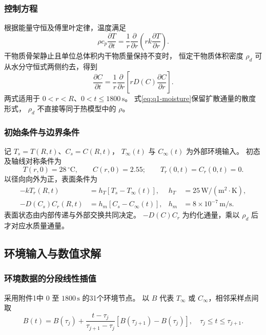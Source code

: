 \subsubsection{控制方程}
根据能量守恒及傅里叶定律，温度满足
\begin{equation}
\rho c_p\frac{\partial T}{\partial t}
=\frac{1}{r}\frac{\partial}{\partial r}
\left(rk\frac{\partial T}{\partial r}\right).
\label{eq:q1-heat}
\end{equation}
干物质骨架静止且单位总体积内干物质量保持不变时，
恒定干物质体积密度 $\rho_d$ 可从水分守恒式两侧约去，得到
\begin{equation}
\frac{\partial C}{\partial t}
=\frac{1}{r}\frac{\partial}{\partial r}
\left[rD(C)\frac{\partial C}{\partial r}\right].
\label{eq:q1-moisture}
\end{equation}
两式适用于 $0<r<R$、$0<t\le1800\,\mathrm{s}$。
式\eqref{eq:q1-moisture}保留扩散通量的散度形式，
$\rho_d$ 不直接等同于热模型中的 $\rho$。

\subsubsection{初始条件与边界条件}
记 $T_s=T(R,t)$、$C_s=C(R,t)$，
$T_\infty(t)$ 与 $C_\infty(t)$ 为外部环境输入。
初态及轴线对称条件为
\begin{equation}
T(r,0)=28\,{}^\circ\mathrm C,\qquad C(r,0)=2.55;
\qquad T_r(0,t)=C_r(0,t)=0.
\label{eq:q1-initial-axis}
\end{equation}
以径向向外为正，表面条件为
\begin{align}
-kT_r(R,t)&=h_T[T_s-T_\infty(t)],
&h_T&=25\,\mathrm{W/(m^2\cdot K)},\label{eq:q1-heat-robin}\\
-D(C_s)C_r(R,t)&=h_m[C_s-C_\infty(t)],
&h_m&=8\times10^{-7}\,\mathrm{m/s}.\label{eq:q1-mass-robin}
\end{align}
表面状态由内部传递与外部交换共同决定。
$-D(C)C_r$ 为约化通量，乘以 $\rho_d$ 后才对应水质量通量。

\subsection{环境输入与数值求解}
\subsubsection{环境数据的分段线性插值}
采用附件1中 $0$ 至 $1800\,\mathrm{s}$ 的31个环境节点。
以 $B$ 代表 $T_\infty$ 或 $C_\infty$，相邻采样点间取
\begin{equation}
B(t)=B(\tau_j)+\frac{t-\tau_j}{\tau_{j+1}-\tau_j}
[B(\tau_{j+1})-B(\tau_j)],\quad \tau_j\le t\le\tau_{j+1}.
\label{eq:q1-interpolation}
\end{equation}

